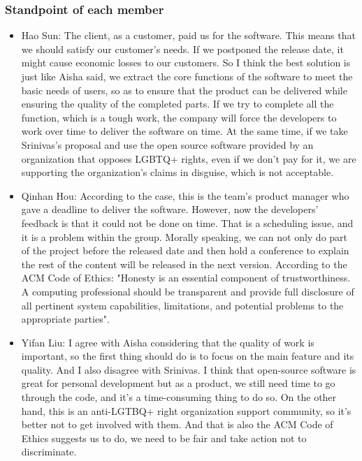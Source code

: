 		\subsubsection{Standpoint of each member}
		\begin{itemize}
  			\item Hao Sun: The client, as a customer, paid us for the software. This means that we should satisfy our customer's needs. If we postponed the release date, it might cause economic losses to our customers. So I think the best solution is just like Aisha said, we extract the core functions of the software to meet the basic needs of users, so as to ensure that the product can be delivered while ensuring the quality of the completed parts. If we try to complete all the function, which is a tough work, the company will force the developers to work over time to deliver the software on time. At the same time, if we take Srinivas’s proposal and use the open source software provided by an organization that opposes LGBTQ+ rights, even if we don’t pay for it, we are supporting the organization’s claims in disguise, which is not acceptable. 
  			\item Qinhan Hou: According to the case, this is the team's product manager who gave a deadline to deliver the software. However, now the developers' feedback is that it could not be done on time. That is a scheduling issue, and it is a problem within the group. Morally speaking, we can not only do part of the project before the released date and then hold a conference to explain the rest of the content will be released in the next version. According to the ACM Code of Ethics: "Honesty is an essential component of trustworthiness. A computing professional should be transparent and provide full disclosure of all pertinent system capabilities, limitations, and potential problems to the appropriate parties".
  			\item Yifan Liu: I agree with Aisha considering that the quality of work is important, so the first thing should do is to focus on the main feature and its quality. And I also disagree with Srinivas. I think that open-source software is great for personal development but as a product, we still need time to go through the code, and it's a time-consuming thing to do so. On the other hand, this is an anti-LGTBQ+ right organization support community, so it's better not to get involved with them. 
  			And that is also the ACM Code of Ethics suggests us to do, we need to be fair and take action not to discriminate.

\end{itemize}
